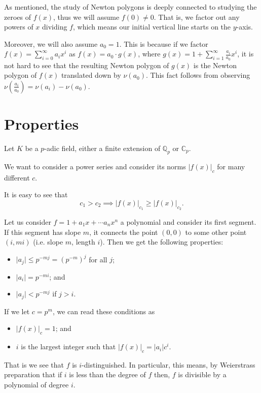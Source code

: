 As mentioned, the study of Newton polygons is deeply connected to studying the zeroes of $f(x)$,
thus we will assume $f(0) \neq 0$. That is, we factor out any powers of $x$ dividing $f$, which
means our initial vertical line starts on the $y$-axis.

Moreover, we will also assume $a_0 = 1$. This is because if we factor
$f(x) = \sum_{i = 0}^\infty a_i x^i$ as $f(x) = a_0 \cdot g(x)$, where
$g(x) = 1 + \sum_{i=1}^\infty \frac{a_i}{a_0}x^i$, it is not hard to see that the resulting Newton
polygon of $g(x)$ is the Newton polygon of $f(x)$ translated down by $\nu (a_0)$.
This fact follows from observing $\nu (\frac{a_i}{a_0}) = \nu(a_i) - \nu (a_0)$.

\section{Properties}

Let $K$ be a $p$-adic field, either a finite extension of $\mathbb{Q}_p$ or $\mathbb{C}_p$.

We want to consider a power series and consider its norms $\lvert f(x) \rvert_c$ for many different
$c$.

It is easy to see that
\[
c_1 > c_2 \implies \lvert f(x) \rvert_{c_1} \geq \lvert f(x) \rvert_{c_2}.
\]

Let us consider $f = 1 + a_1 x + \cdots a_n x^n$ a polynomial and consider its first segment. If this
segment has slope $m$, it connects the point $(0,0)$ to some other point $(i, mi)$ (i.e. slope $m$,
length $i$). Then we get the following properties:
\begin{itemize}
  \item $\lvert a_j \rvert \leq p^{-mj} = (p^{-m})^j$  for all $j$;
  \item $\lvert a_i \rvert = p^{-mi}$; and
  \item $\lvert a_j \rvert < p^{-mj}$ if $j > i$.
\end{itemize}

If we let $c = p^m$, we can read these conditions as
\begin{itemize}
  \item $\lvert f(x) \rvert_c = 1$; and
  \item $i$ is the largest integer such that $\lvert f(x) \rvert_c = \lvert a_i \rvert c^i.$
\end{itemize}

That is we see that $f$ is $i$-distinguished. In particular, this means, by Weierstrass preparation
that if $i$ is less than the degree of $f$ then, $f$ is divisible by a polynomial of degree $i$.


